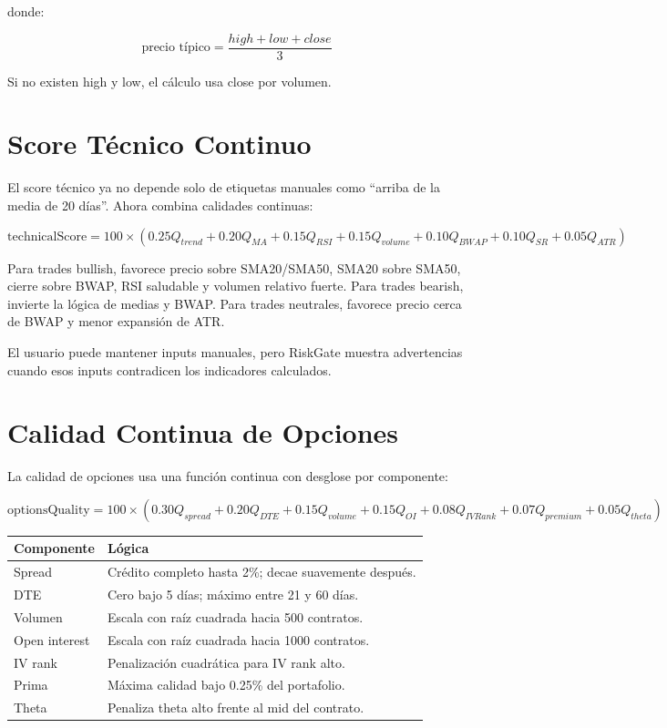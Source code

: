 \documentclass[11pt,letterpaper]{article}
\begin{document}
donde:

\[
\text{precio típico} = \frac{high + low + close}{3}
\]

Si no existen high y low, el cálculo usa close por volumen.

\section{Score Técnico Continuo}

El score técnico ya no depende solo de etiquetas manuales como ``arriba de la media de 20 días''. Ahora combina calidades continuas:

\[
\text{technicalScore} = 100 \times (
0.25Q_{trend} +
0.20Q_{MA} +
0.15Q_{RSI} +
0.15Q_{volume} +
0.10Q_{BWAP} +
0.10Q_{SR} +
0.05Q_{ATR})
\]

Para trades bullish, favorece precio sobre SMA20/SMA50, SMA20 sobre SMA50, cierre sobre BWAP, RSI saludable y volumen relativo fuerte. Para trades bearish, invierte la lógica de medias y BWAP. Para trades neutrales, favorece precio cerca de BWAP y menor expansión de ATR.

El usuario puede mantener inputs manuales, pero RiskGate muestra advertencias cuando esos inputs contradicen los indicadores calculados.

\section{Calidad Continua de Opciones}

La calidad de opciones usa una función continua con desglose por componente:

\[
\text{optionsQuality} = 100 \times (
0.30Q_{spread} +
0.20Q_{DTE} +
0.15Q_{volume} +
0.15Q_{OI} +
0.08Q_{IVRank} +
0.07Q_{premium} +
0.05Q_{theta})
\]

\begin{table}[h]
\centering
\begin{tabular}{ll}
\toprule
Componente & Lógica \\
\midrule
Spread & Crédito completo hasta 2\%; decae suavemente después. \\
DTE & Cero bajo 5 días; máximo entre 21 y 60 días. \\
Volumen & Escala con raíz cuadrada hacia 500 contratos. \\
Open interest & Escala con raíz cuadrada hacia 1000 contratos. \\
IV rank & Penalización cuadrática para IV rank alto. \\
Prima & Máxima calidad bajo 0.25\% del portafolio. \\
Theta & Penaliza theta alto frente al mid del contrato. \\
\bottomrule
\end{tabular}
\end{table}
\end{document}
